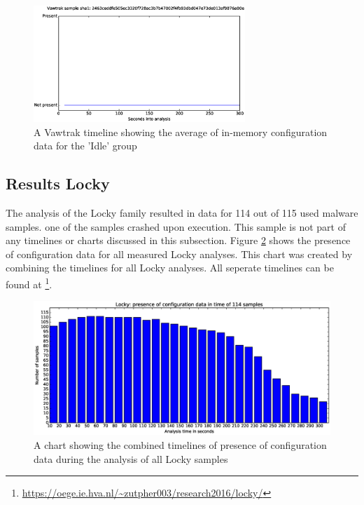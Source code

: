 \documentclass[conference]{IEEEtran}
\begin{document}
\begin{figure}[!h]
    \includegraphics[width=8cm,scale=0.5]{images/vawtrak/vawtrak-timelines-eps/Vawtrak-2463ceddfe505ec3320f728ac3b7b47002f4fb93dbd047e73de013af9876a80e.eps}
    \caption{A Vawtrak timeline showing the average of in-memory configuration data for the 'Idle' group}
    \label{fig:vawtrak-timeline-idle}
\end{figure}


\subsection{Results Locky}
The analysis of the Locky family resulted in data for 114 out of 115 used malware samples. one of the samples crashed upon execution. This sample is not part of any timelines or charts discussed in this subsection. Figure \ref{fig:locky-bar} shows the presence of configuration data for all measured Locky analyses. This chart was created by combining the timelines for all Locky analyses. All seperate timelines can be found at \footnote{\url{https://oege.ie.hva.nl/~zutpher003/research2016/locky/}}.\\


\begin{figure}[h]
	\hspace{-3cm}
    \includegraphics[width=13cm,trim=-70mm 0mm 0mm 9mm, clip=true]{images/locky/Locky-barchart.eps}
    \caption{A chart showing the combined timelines of presence of configuration data during the analysis of all Locky samples}
    \label{fig:locky-bar}
\end{figure}
\end{document}
